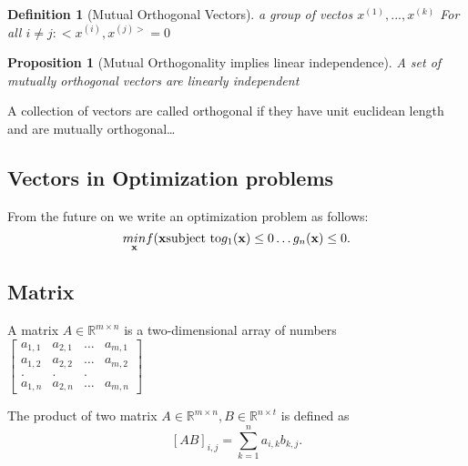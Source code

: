 \documentclass[11pt]{article}
\newtheorem{definition}[theorem]{Definition}
\newtheorem{proposition}[theorem]{Proposition}
\begin{document}
\begin{definition}[Mutual Orthogonal Vectors] a group of vectos $x^{(1)}, ..., x^{(k)}$ 
    For all $i \neq j: <x^{(i)}, x^{(j)>} = 0$ 
    
\end{definition}

\begin{proposition}[Mutual Orthogonality implies linear independence]
    A set of mutually orthogonal vectors are linearly independent
    
\end{proposition}

A collection of vectors are called orthogonal if they have unit euclidean length and are mutually orthogonal\dots


\subsection*{Vectors in Optimization problems}
From the future on we write an optimization problem as follows:
\[
\underset{\textbf{x} }{min} f(\textbf{x}
\newline \text{subject to}
g_1(\textbf{x} ) \leq 0 
\newline
\dots
\newline
g_n(\textbf{x} ) \leq 0 
.\] 

\subsection*{Matrix}
A matrix $A \in \mathbb{R}^{m\times n}$ is a two-dimensional array of numbers
$\begin{bmatrix} a_{1,1} & a_{2,1} & \dots & a_{m,1}\\
    a_{1,2} & a_{2,2} & \dots & a_{m,2}\\
    . & . & . \\
    a_{1,n} & a_{2,n} & \dots & a_{m,n}

\end{bmatrix} $  

The product of two matrix $A \in \mathbb{R}^{m\times n}, B \in \mathbb{R}^{n\times t}$ is defined as
\[
[AB]_{i,j} = \sum_{k=1}^{n} a_{i,k}b_{k,j}
.\]  
\end{document}
